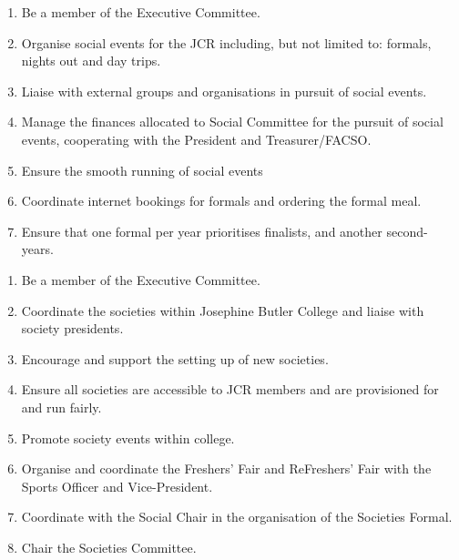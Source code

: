 \begin{enumerate}
    \item Be a member of the Executive Committee.
    \item Organise social events for the JCR including, but not limited to: formals, nights out and day trips.
    \item Liaise with external groups and organisations in pursuit of social events.
    \item Manage the finances allocated to Social Committee for the pursuit of social events, cooperating with the President and Treasurer/FACSO.
    \item Ensure the smooth running of social events
    \item Coordinate internet bookings for formals and ordering the formal meal.
    \item Ensure that one formal per year prioritises finalists, and another second-years.
\end{enumerate}

\begin{enumerate}
    \item Be a member of the Executive Committee.
    \item Coordinate the societies within Josephine Butler College and liaise with society presidents.
    \item Encourage and support the setting up of new societies.
    \item Ensure all societies are accessible to JCR members and are provisioned for and run fairly.
    \item Promote society events within college.
    \item Organise and coordinate the Freshers' Fair and ReFreshers' Fair with the Sports Officer and Vice-President.
    \item Coordinate with the Social Chair in the organisation of the Societies Formal.
    \item Chair the Societies Committee.
\end{enumerate}

